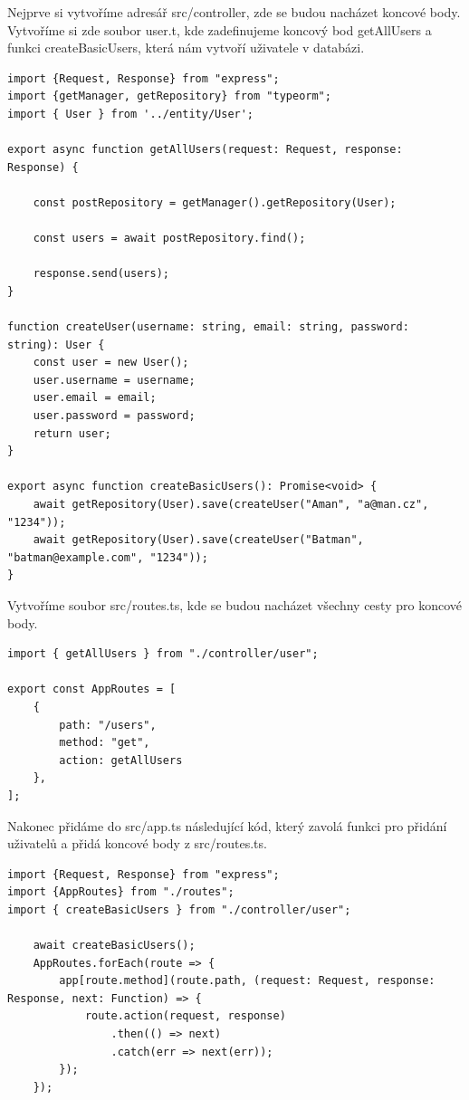 \documentclass[thesis=B,czech]{FITthesis}[2012/06/26]
\begin{document}
            Nejprve si vytvoříme adresář src/controller, zde se budou nacházet koncové body. Vytvoříme si zde soubor user.t, kde zadefinujeme koncový bod getAllUsers a funkci createBasicUsers, která nám vytvoří uživatele v databázi.
            \begin{verbatim}
import {Request, Response} from "express";
import {getManager, getRepository} from "typeorm";
import { User } from '../entity/User';

export async function getAllUsers(request: Request, response: Response) {

    const postRepository = getManager().getRepository(User);

    const users = await postRepository.find();

    response.send(users);
}

function createUser(username: string, email: string, password: string): User {
    const user = new User();
    user.username = username;
    user.email = email;
    user.password = password;
    return user;
}

export async function createBasicUsers(): Promise<void> {
    await getRepository(User).save(createUser("Aman", "a@man.cz", "1234"));
    await getRepository(User).save(createUser("Batman", "batman@example.com", "1234"));
}
            \end{verbatim}
            Vytvoříme soubor src/routes.ts, kde se budou nacházet všechny cesty pro koncové body.
            \begin{verbatim}
import { getAllUsers } from "./controller/user";

export const AppRoutes = [
    {
        path: "/users",
        method: "get",
        action: getAllUsers
    },
];
            \end{verbatim}
            Nakonec přidáme do src/app.ts následující kód, který zavolá funkci pro přidání uživatelů a přidá koncové body z src/routes.ts.
            \begin{verbatim}
import {Request, Response} from "express";
import {AppRoutes} from "./routes";
import { createBasicUsers } from "./controller/user";

    await createBasicUsers();
    AppRoutes.forEach(route => {
        app[route.method](route.path, (request: Request, response: Response, next: Function) => {
            route.action(request, response)
                .then(() => next)
                .catch(err => next(err));
        });
    });
            \end{verbatim}
\end{document}
